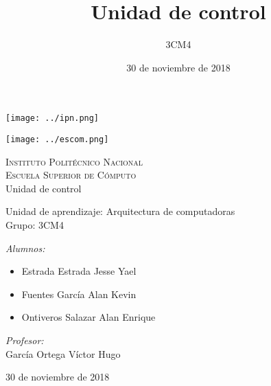 \documentclass[11pt]{article}
\date{30 de noviembre de 2018}
\title{Unidad de control}
\author{3CM4}
\begin{document}
	\begin{titlepage}
		\begin{center}
			
			
			\noindent
			\begin{minipage}{0.5\textwidth}
				\begin{flushleft} \large
					\texttt{[image: ../ipn.png]}
				\end{flushleft}
			\end{minipage}%
			\begin{minipage}{0.55\textwidth}
				\begin{flushright} \large
					\texttt{[image: ../escom.png]}
				\end{flushright}
			\end{minipage}
			
			\textsc{\LARGE Instituto Politécnico Nacional}\\[0.5cm]
			
			\textsc{\Large Escuela Superior de Cómputo}\\[1cm]
			
			
			{ \huge Unidad de control \\[1cm] }
			
			{ \Large Unidad de aprendizaje: Arquitectura de computadoras} \\[1cm]
			
			{ \Large Grupo: 3CM4 } \\[1cm]
			
			\noindent
			\begin{minipage}{0.5\textwidth}
				\begin{flushleft} \large
					\emph{Alumnos:}\begin{itemize}\setlength\itemsep{0em}
						\item Estrada Estrada Jesse Yael
						\item Fuentes García Alan Kevin
						\item Ontiveros Salazar Alan Enrique
					\end{itemize}
				\end{flushleft}
			\end{minipage}%
			\begin{minipage}{0.5\textwidth}
				\begin{flushright} \large
					\emph{Profesor:} \\
					García Ortega Víctor Hugo
				\end{flushright}
			\end{minipage}
			
			\vfill
			
			{\large 30 de noviembre de 2018}
		\end{center}
	\end{titlepage}
\end{document}
